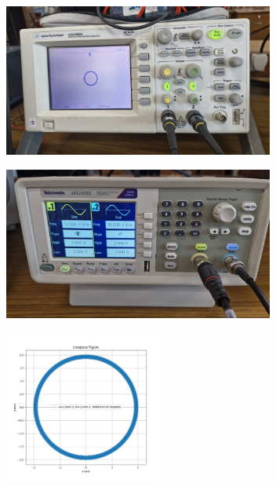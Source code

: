 \documentclass[a4paper,12pt]{article}
\begin{document}
\begin{figure}[H]
    \centering
    \begin{subfigure}{\textwidth}
        \centering
        \includegraphics[height=5cm]{figures/2/plot.jpg}
    \end{subfigure}%
    \begin{subfigure}{\textwidth}
        \centering
        \includegraphics[height=5cm]{figures/2/para.jpg}
    \end{subfigure}
    \begin{subfigure}{\textwidth}
        \centering
        \includegraphics[height=5cm]{figures/2/Figure_2.png}
    \end{subfigure}%
\end{figure}
\end{document}
